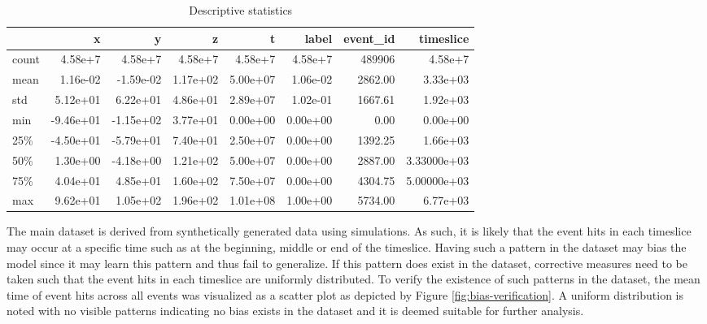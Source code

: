 \begin{table}[htb]
  \centering
  \caption{Descriptive statistics}
  \label{tab:desc-stats}
  \begin{tabular}{lrrrrrrr}
    \hline
          & x & y & z & t & label & event\_id & timeslice \\
    \hline
    count & 4.58e+7 &  4.58e+7 &  4.58e+7 &  4.58e+7 &  4.58e+7 &  489906 &  4.58e+7 \\
    mean  & 1.16e-02 & -1.59e-02 &  1.17e+02 &  5.00e+07 &  1.06e-02 &    2862.00 &  3.33e+03 \\
    std   & 5.12e+01 &  6.22e+01 &  4.86e+01 &  2.89e+07 &  1.02e-01 &    1667.61 &  1.92e+03 \\
    min   & -9.46e+01 & -1.15e+02 &  3.77e+01 &  0.00e+00 &  0.00e+00 &       0.00 &  0.00e+00 \\
    25\%  & -4.50e+01 & -5.79e+01 &  7.40e+01 &  2.50e+07 &  0.00e+00 &    1392.25 &  1.66e+03 \\
    50\%  & 1.30e+00 & -4.18e+00 &  1.21e+02 &  5.00e+07 &  0.00e+00 &    2887.00 &  3.33000e+03 \\
    75\%  & 4.04e+01 &  4.85e+01 &  1.60e+02 &  7.50e+07 &  0.00e+00 &    4304.75 &  5.00000e+03 \\
    max  & 9.62e+01 &  1.05e+02 &  1.96e+02 &  1.01e+08 &  1.00e+00 &    5734.00 &  6.77e+03 \\
    \hline
  \end{tabular}
\end{table}

The main dataset is derived from synthetically generated data using
simulations. As such, it is likely that the event hits in each
timeslice may occur at a specific time such as at the beginning,
middle or end of the timeslice. Having such a pattern in the dataset
may bias the model since it may learn this pattern and thus fail to
generalize. If this pattern does exist in the dataset, corrective
measures need to be taken such that the event hits in each timeslice
are uniformly distributed. To verify the existence of such patterns in
the dataset, the mean time of event hits across all events was
visualized as a scatter plot as depicted by Figure
\ref{fig:bias-verification}. A uniform distribution is noted with no
visible patterns indicating no bias exists in the dataset and it is
deemed suitable for further analysis.

